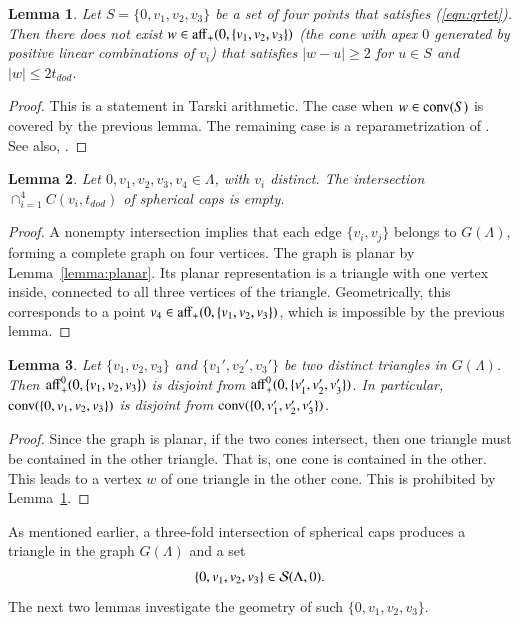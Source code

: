 \documentclass{article} %
\newtheorem{lemma}{Lemma}[subsection]
\begin{document}
\begin{lemma}\label{lemma:enclosed} 
Let $S=\{0,v_1,v_2,v_3\}$ be a set of four points
that satisfies (\ref{eqn:qrtet}).  Then
there does not exist $w\in{\operatorname{aff}}_+(0,\{v_1,v_2,v_3\})$
(the cone with apex $0$ 
generated by positive linear combinations of $v_i$) 
that satisfies $|w-u|\ge 2$ for 
$u\in S$ and $|w|\le 2t_{dod}$.
\end{lemma}

\begin{proof} This is a statement in Tarski arithmetic. The case when
$w\in{\operatorname{conv}}(S)$ is covered by the previous lemma. The remaining
case is a reparametrization of \cite[Lemma~4.19]{Hales:2006:DCG}. See
also, \cite[Cor~3.7]{Hales:2002:Dodec}.
\end{proof}

\begin{lemma}\label{lemma:4fold}  
Let $0,v_1,v_2,v_3,v_4\in\Lambda$, with
$v_i$ distinct.  The intersection $\cap_{i=1}^4 C(v_i,t_{dod})$
of spherical caps is empty.
\end{lemma}

\begin{proof}  A nonempty intersection implies that each
edge $\{v_i,v_j\}$ belongs to  $G(\Lambda)$, forming a complete graph
on four vertices.  The graph is planar by Lemma~\ref{lemma:planar}.
Its planar representation is a triangle with one vertex inside,
connected to all three vertices of the triangle.
Geometrically, this corresponds to a point $v_4\in{\operatorname{aff}}_+(0,\{v_1,v_2,v_3\})$, which is impossible by the previous lemma.
\end{proof}

\begin{lemma}  Let $\{v_1,v_2,v_3\}$ and $\{v_1',v_2',v_3'\}$
be two distinct triangles in $G(\Lambda)$.  Then
${\operatorname{aff}}_+^0(0,\{v_1,v_2,v_3\})$ is disjoint from
${\operatorname{aff}}_+^0(0,\{v_1',v_2',v_3'\})$.  In particular,
${\operatorname{conv}}(\{0,v_1,v_2,v_3\})$ is disjoint from
${\operatorname{conv}}(\{0,v_1',v_2',v_3'\})$.
\end{lemma}

\begin{proof} Since the graph is planar, if the two cones
intersect, then one triangle must be contained in the other
triangle.  That is, one cone is contained in the other.  This
leads to a vertex $w$ of one triangle in the other
cone.  This is prohibited
by Lemma~\ref{lemma:enclosed}.
\end{proof}

As mentioned earlier, a three-fold intersection of spherical
caps produces a triangle in the graph $G(\Lambda)$ and a 
set 
$$\{0,v_1,v_2,v_3\}\in {\mathcal S}(\Lambda,0).$$
The next two lemmas investigate the geometry of such $\{0,v_1,v_2,v_3\}$.
\end{document}
